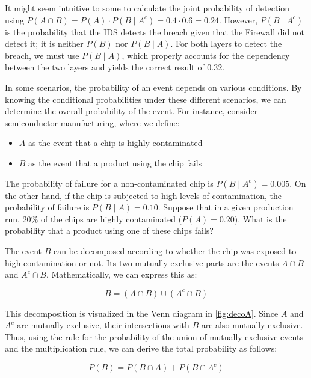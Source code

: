 \begin{remark}
    It might seem intuitive to some to calculate the joint probability of detection using $P(A \cap B)=P(A) \cdot P(B \mid A^c)=0.4 \cdot 0.6=0.24$. However, $P(B \mid A^c)$ is the probability that the IDS detects the breach given that the Firewall did not detect it; it is neither $P(B)$ nor $P(B \mid A)$. For both layers to detect the breach, we must use $P(B \mid A)$, which properly accounts for the dependency between the two layers and yields the correct result of 0.32.
\end{remark}

In some scenarios, the probability of an event depends on various conditions. By knowing the conditional probabilities under these different scenarios, we can determine the overall probability of the event. For instance, consider semiconductor manufacturing, where we define:
\begin{itemize}
    \item \( A \) as the event that a chip is highly contaminated
    \item \( B \) as the event that a product using the chip fails
\end{itemize}
The probability of failure for a non-contaminated chip is \( P(B \mid A^c) = 0.005 \). On the other hand, if the chip is subjected to high levels of contamination, the probability of failure is \( P(B \mid A) = 0.10 \). Suppose that in a given production run, \( 20\% \) of the chips are highly contaminated (\( P(A) = 0.20 \)). What is the probability that a product using one of these chips fails?

The event \( B \) can be decomposed according to whether the chip was exposed to high contamination or not. Its two mutually exclusive parts are the events \( A \cap B \) and \( A^c \cap B \). Mathematically, we can express this as:

\[
B = (A \cap B) \cup (A^c \cap B)
\]

This decomposition is visualized in the Venn diagram in \autoref{fig:decoA}. Since \( A \) and \( A^c \) are mutually exclusive, their intersections with \( B \) are also mutually exclusive. Thus, using the rule for the probability of the union of mutually exclusive events and the multiplication rule, we can derive the total probability as follows:

\[
P(B) = P(B \cap A) + P(B \cap A^c)
\]

\def\firstellipse{(3,1) ellipse (4.5cm and 2.2cm)} %

